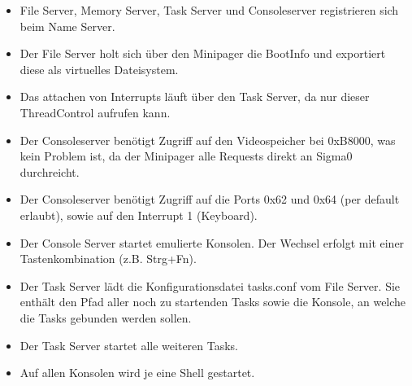 \begin{itemize}
	\item File Server, Memory Server, Task Server und Consoleserver registrieren sich beim Name Server.
	
	\item Der File Server holt sich über den Minipager die BootInfo und exportiert diese als virtuelles Dateisystem.
	
	\item Das attachen von Interrupts läuft über den Task Server, da nur dieser ThreadControl aufrufen kann.
	
	\item Der Consoleserver benötigt Zugriff auf den Videospeicher bei 0xB8000, was kein Problem ist, da der Minipager alle Requests direkt an Sigma0 durchreicht.
	
	\item Der Consoleserver benötigt Zugriff auf die Ports 0x62 und 0x64 (per default erlaubt), sowie auf den Interrupt 1 (Keyboard).

	\item Der Console Server startet emulierte Konsolen. Der Wechsel erfolgt mit einer Tastenkombination (z.B. Strg+Fn).
	
	\item Der Task Server lädt die Konfigurationsdatei tasks.conf vom File Server. Sie enthält den Pfad aller noch zu startenden Tasks sowie die Konsole, an welche die Tasks gebunden werden sollen.
	
	\item Der Task Server startet alle weiteren Tasks.
	
	\item Auf allen Konsolen wird je eine Shell gestartet.
\end{itemize}